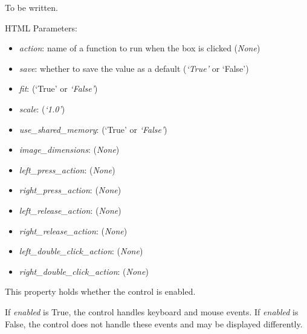 \documentclass[letterpaper,10pt,english]{sphinxmanual}
\begin{document}

\begin{fulllineitems}
\label{api:controls.Image}
To be written.

HTML Parameters:
\begin{itemize}
\item {} 
\emph{action}: name of a function to run when the box is clicked (\emph{None})

\item {} 
\emph{save}: whether to save the value as a default (\emph{`True'} or `False')

\item {} 
\emph{fit}: (`True' or \emph{`False'})

\item {} 
\emph{scale}: (\emph{`1.0'})

\item {} 
\emph{use\_shared\_memory}: (`True' or \emph{`False'})

\item {} 
\emph{image\_dimensions}: (\emph{None})

\item {} 
\emph{left\_press\_action}: (\emph{None})

\item {} 
\emph{right\_press\_action}: (\emph{None})

\item {} 
\emph{left\_release\_action}: (\emph{None})

\item {} 
\emph{right\_release\_action}: (\emph{None})

\item {} 
\emph{left\_double\_click\_action}: (\emph{None})

\item {} 
\emph{right\_double\_click\_action}: (\emph{None})

\end{itemize}

\begin{fulllineitems}
\label{api:controls.Image.enabled}
This property holds whether the control is enabled.

If \emph{enabled} is True, the control handles keyboard and mouse events.
If \emph{enabled} is False, the control does not handle these events and may
be displayed differently.


\end{fulllineitems}
\end{fulllineitems}
\end{document}
